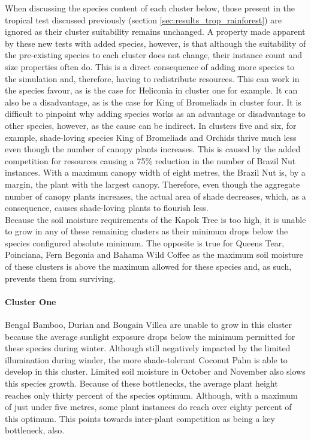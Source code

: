 When discussing the species content of each cluster below, those present in the tropical test discussed previously (section \ref{sec:results_trop_rainforest}) are ignored as their cluster suitability remains unchanged. A property made apparent by these new tests with added species, however, is that although the suitability of the pre-existing species to each cluster does not change, their instance count and size properties often do. This is a direct consequence of adding more species to the simulation and, therefore, having to redistribute resources. This can work in the species favour, as is the case for Heliconia in cluster one for example. It can also be a disadvantage, as is the case for King of Bromeliads in cluster four. It is difficult to pinpoint why adding species works as an advantage or disadvantage to other species, however, as the cause can be indirect. In clusters five and six, for example, shade-loving species King of Bromeliads and Orchids thrive much less even though the number of canopy plants increases. This is caused by the added competition for resources causing a 75\% reduction in the number of Brazil Nut instances. With a maximum canopy width of eight metres, the Brazil Nut is, by a margin, the plant with the largest canopy. Therefore, even though the aggregate number of canopy plants increases, the actual area of shade decreases, which, as a consequence, causes shade-loving plants to flourish less.\\

Because the soil moisture requirements of the Kapok Tree is too high, it is unable to grow in any of these remaining clusters as their minimum drops below the species configured absolute minimum. The opposite is true for Queens Tear, Poinciana, Fern Begonia and Bahama Wild Coffee as the maximum soil moisture of these clusters is above the maximum allowed for these species and, as such, prevents them from surviving.\\

\paragraph{Cluster One}

Bengal Bamboo, Durian and Bougain Villea are unable to grow in this cluster because the  average sunlight exposure drops below the minimum permitted for these species during winter. Although still negatively impacted by the limited illumination during winder, the more shade-tolerant Coconut Palm is able to develop in this cluster. Limited soil moisture in October and November also slows this species growth. Because of these bottlenecks, the average plant height reaches only thirty percent of the species optimum. Although, with a maximum of just under five metres, some plant instances do reach over eighty percent of this optimum. This points towards inter-plant competition as being a key bottleneck, also.

